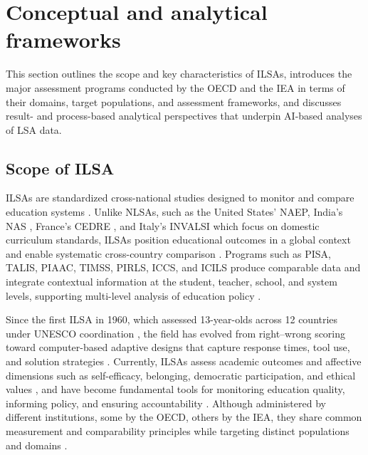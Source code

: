 \documentclass{ieeeaccess}
\begin{document}
\section{Conceptual and analytical frameworks}\label{sec2}

This section outlines the scope and key characteristics of ILSAs, introduces the major assessment programs conducted by the OECD and the IEA in terms of their domains, target populations, and assessment frameworks, and discusses result- and process-based analytical perspectives that underpin AI-based analyses of LSA data.

\subsection{Scope of ILSA}\label{subsec2.1}

ILSAs are standardized cross-national studies designed to monitor and compare education systems \cite{aydogan-tat2024}. Unlike NLSAs, such as the United States' NAEP, India's NAS \cite{luna-bazaldua-clarke2022}, France's CEDRE \cite{deschipper-etal2025}, and Italy's INVALSI \cite{bungaro-etal2024} which focus on domestic curriculum standards, ILSAs position educational outcomes in a global context and enable systematic cross-country comparison \cite{lee-lee-ExtendedDataset2025, salles-etal2020}. Programs such as PISA, TALIS, PIAAC, TIMSS, PIRLS, ICCS, and ICILS produce comparable data and integrate contextual information at the student, teacher, school, and system levels, supporting multi-level analysis of education policy \cite{hernandez-torrano-courtney2021, scherer-etal2024, soares2024}.

Since the first ILSA in 1960, which assessed 13-year-olds across 12 countries under UNESCO coordination \cite{foshay-etal1962}, the field has evolved from right--wrong scoring toward computer-based adaptive designs that capture response times, tool use, and solution strategies \cite{teig2023, zhang-etal2023, fink-etal2024}. Currently, ILSAs assess academic outcomes and affective dimensions such as self-efficacy, belonging, democratic participation, and ethical values \cite{michaelo-martinIEAsTechnicalStandards2025}, and have become fundamental tools for monitoring education quality, informing policy, and ensuring accountability \cite{aera2014, alvarez-etal2024}. Although administered by different institutions, some by the OECD, others by the IEA, they share common measurement and comparability principles while targeting distinct populations and domains \cite{hernandez-torrano-courtney2021, lee-lee-ExtendedDataset2025}.
\end{document}
